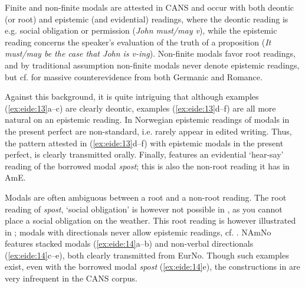 \documentclass[output=paper]{langscibook}
\begin{document}
Finite and non-finite modals are attested in CANS and occur with both deontic (or root) and epistemic (and evidential) readings, where the deontic reading is e.g. social obligation or permission (\textit{John must/may v}), while the epistemic reading concerns the speaker’s evaluation of the truth of a proposition (\textit{It must/may be the case that John is v-ing}). Non-finite modals favor root readings, and by traditional assumption non-finite modals never denote epistemic readings, but cf. \citet{Eide2011Modals} for massive counterevidence from both Germanic and Romance.

Against this background, it is quite intriguing that although examples (\ref{ex:eide:13}a–c) are clearly deontic, examples (\ref{ex:eide:13}d--f) are all more natural on an epistemic reading. In Norwegian epistemic readings of modals in the present perfect are non-standard, i.e. rarely appear in edited writing. Thus, the pattern attested in (\ref{ex:eide:13}d–f) with epistemic modals in the present perfect, is clearly transmitted orally. Finally,  features an evidential ‘hear-say’ reading of the borrowed modal \textit{spost}; this is also the non-root reading it has in AmE. 

Modals are often ambiguous between a root and a non-root reading. The root reading of \textit{spost}, ‘social obligation’ is however not possible in , as you cannot place a social obligation on the weather. This root reading is however illustrated in ; modals with directionals never allow epistemic readings, cf.  \citet{Eide2005}. NAmNo features stacked modals (\ref{ex:eide:14}a--b) and non-verbal directionals (\ref{ex:eide:14}c--e), both clearly transmitted from EurNo. Though such examples exist, even with the borrowed modal \textit{spost} (\ref{ex:eide:14}e), the constructions in  are very infrequent in the CANS corpus.
\end{document}
